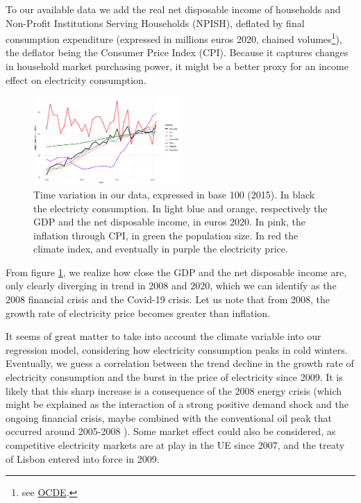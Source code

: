 To our available data we add the real net disposable income of households and Non-Profit Institutions Serving Households (NPISH), deflated by final consumption expenditure (expressed in millions euros 2020, chained volumes\footnote{see \href{https://data-explorer.oecd.org/vis?pg=0&snb=12&vw=tb&df[ds]=dsDisseminateFinalDMZ&df[id]=DSD_NAAG\%40DF_NAAG_V&df[ag]=OECD.SDD.NAD&df[vs]=1.0&dq=A..B6GS1M_POP..&pd=1970\%2C&to[TIME_PERIOD]=false&lb=bt&lc=fr}{OCDE}.}), the deflator being the Consumer Price Index (CPI). Because it captures changes in household market purchasing power, it might be a better proxy for an income effect on electricity consumption.

\begin{figure}[h]
    \centering
      \includegraphics[width=0.5\textwidth]{Images/data_base100_2015.jpeg}
      \caption{Time variation in our data, expressed in base 100 (2015). In black the electricty consumption. In light blue and orange, respectively the GDP and the net disposable income, in euros 2020. In pink, the inflation through CPI, in green the population size. In red the climate index, and eventually in purple the electricity price.}
    \label{fig:var}
  \end{figure}

From figure \ref{fig:var}, we realize how close the GDP and the net disposable income are, only clearly diverging in trend in 2008 and 2020, which we can identify as the 2008 financial crisis and the Covid-19 crisis. Let us note that from 2008, the growth rate of electricity price becomes greater than inflation.

It seems of great matter to take into account the climate variable into our regression model, considering how electricity consumption peaks in cold winters. Eventually, we guess a correlation between the trend decline in the growth rate of electricity consumption and the burst in the price of electricity since 2009. It is likely that this sharp increase is a consequence of the 2008 energy crisis (which might be explained as the interaction of a strong positive demand shock and the ongoing financial crisis, maybe combined with the conventional oil peak that occurred around 2005-2008 \cite{delannoy2021peak}). Some market effect could also be considered, as competitive electricity markets are at play in the UE since 2007, and the treaty of Lisbon entered into force in 2009.

